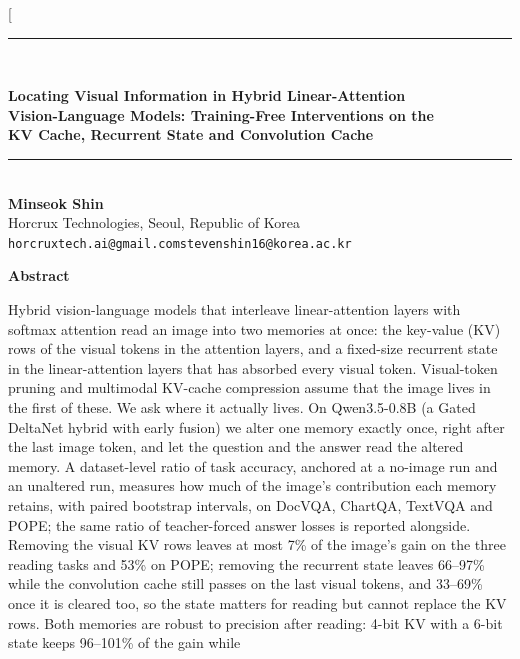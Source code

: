 \documentclass[10pt,twocolumn]{article}
\begin{document}
\twocolumn[{
\begin{center}
\rule{\textwidth}{4pt}\\[0.2in]
{\fontsize{16}{19.5}\selectfont\bfseries Locating Visual Information in Hybrid Linear-Attention\\[1pt]
Vision-Language Models: Training-Free Interventions on the\\[1pt]
KV Cache, Recurrent State and Convolution Cache\par}
\vspace{0.18in}\rule{\textwidth}{1pt}\\[0.2in]
\textbf{Minseok Shin}\\
Horcrux Technologies, Seoul, Republic of Korea\\
\texttt{horcruxtech.ai@gmail.com}\quad\texttt{stevenshin16@korea.ac.kr}
\end{center}
\vspace{0.1in}
\begin{center}{\large\bfseries Abstract}\end{center}
\vspace{-0.5ex}
\begin{list}{}{\leftmargin=0.5in\rightmargin=0.5in}\item[]
Hybrid vision-language models that interleave linear-attention layers with softmax attention read an image into
two memories at once: the key-value (KV) rows of the visual tokens in the attention layers, and a fixed-size
recurrent state in the linear-attention layers that has absorbed every visual token. Visual-token pruning and
multimodal KV-cache compression assume that the image lives in the first of these. We ask where it actually lives.
On Qwen3.5-0.8B (a Gated DeltaNet hybrid with early fusion) we alter one memory exactly once, right after the last
image token, and let the question and the answer read the altered memory. A dataset-level ratio of task accuracy,
anchored at a no-image run and an unaltered run, measures how much of the image's contribution each memory
retains, with paired bootstrap intervals, on DocVQA, ChartQA, TextVQA and POPE; the same ratio of teacher-forced
answer losses is reported alongside.
Removing the visual KV rows leaves at most 7\% of the image's gain on the three reading tasks and 53\% on POPE;
removing the recurrent state leaves 66--97\% while the convolution cache still passes on the last visual tokens,
and 33--69\% once it is cleared too, so the state matters for reading but cannot replace the KV rows. Both
memories are robust to precision after reading: 4-bit KV with a 6-bit state keeps 96--101\% of the gain while

\end{list}}
\end{document}
